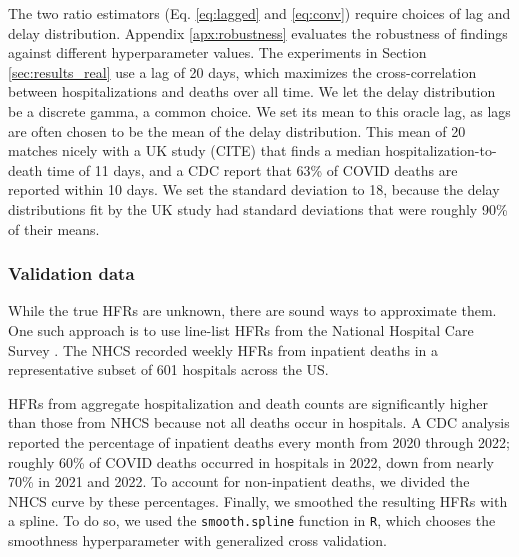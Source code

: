 \documentclass{article}
\newcommand{\ahcomment}[1]{{\color{red}[AH: #1]}}
\begin{document}
The two ratio estimators (Eq. \eqref{eq:lagged} and \eqref{eq:conv}) require choices of lag and delay distribution. Appendix \ref{apx:robustness} evaluates the robustness of findings against different hyperparameter values. The experiments in Section \ref{sec:results_real} use a lag of 20 days, which maximizes the cross-correlation between hospitalizations and deaths over all time. We let the delay distribution be a discrete gamma, a common choice. We set its mean to this oracle lag, as lags are often chosen to be the mean of the delay distribution. This mean of 20 matches nicely with a UK study (CITE) that finds a median hospitalization-to-death time of 11 days, and a CDC report that 63\% of COVID deaths are reported within 10 days. We set the standard deviation to 18, because the delay distributions fit by the UK study had standard deviations that were roughly 90\% of their means. 



\subsubsection{Validation data}
While the true HFRs are unknown, there are sound ways to approximate them. One such approach is to use line-list HFRs from the National Hospital Care Survey \citep{NHCS2023}. The NHCS recorded weekly HFRs from inpatient deaths in a representative subset of 601 hospitals across the US. %

HFRs from aggregate hospitalization and death counts are significantly higher than those from NHCS because not all deaths occur in hospitals. A CDC analysis reported the percentage of inpatient deaths every month from 2020 through 2022; roughly 60\% of COVID deaths occurred in hospitals in 2022, down from nearly 70\% in 2021 and 2022. To account for non-inpatient deaths, we divided the NHCS curve by these percentages. Finally, we smoothed the resulting HFRs with a spline. To do so, we used the \texttt{smooth.spline} function in \texttt{R}, which chooses the smoothness hyperparameter with generalized cross validation. %
\end{document}
